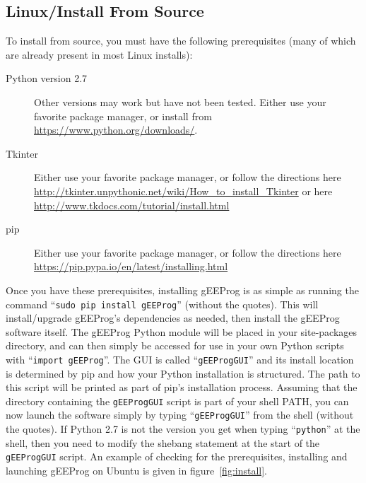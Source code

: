\documentclass[letter]{article}
\begin{document}
\subsection{Linux/Install From Source}
To install from source, you must have the following prerequisites (many of which are already present in most Linux installs):
\begin{description}
	\item[Python version 2.7] Other versions may work but have not been tested. Either use your favorite package manager, or install from \url{https://www.python.org/downloads/}.
	\item[Tkinter] Either use your favorite package manager, or follow the directions here \url{http://tkinter.unpythonic.net/wiki/How_to_install_Tkinter} or here \url{http://www.tkdocs.com/tutorial/install.html}
	\item[pip] Either use your favorite package manager, or follow the directions here \url{https://pip.pypa.io/en/latest/installing.html}
\end{description}
Once you have these prerequisites, installing gEEProg is as simple as running the command ``\texttt{sudo pip install gEEProg}'' (without the quotes).
This will install/upgrade gEEProg's dependencies as needed, then install the gEEProg software itself.
The gEEProg Python module will be placed in your site-packages directory, and can then simply be accessed for use in your own Python scripts with ``\texttt{import gEEProg}''.
The GUI is called ``\texttt{gEEProgGUI}'' and its install location is determined by pip and how your Python installation is structured.
The path to this script will be printed as part of pip's installation process.
Assuming that the directory containing the \texttt{gEEProgGUI} script is part of your shell PATH, you can now launch the software simply by typing ``\texttt{gEEProgGUI}'' from the shell (without the quotes).
If Python 2.7 is not the version you get when typing ``\texttt{python}'' at the shell, then you need to modify the shebang statement at the start of the \texttt{gEEProgGUI} script.
An example of checking for the prerequisites, installing and launching gEEProg on Ubuntu is given in figure~\ref{fig:install}.
\end{document}
